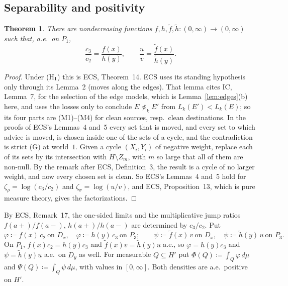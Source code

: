 \documentclass[11pt]{article}
\newtheorem{theorem}{Theorem}
\theoremstyle{definition}\newtheorem{definition}[theorem]{Definition}
\theoremstyle{remark}\newtheorem{remark}[theorem]{Remark}
\newcommand{\ftil}{\tilde f}
\newcommand{\htil}{\tilde h}
\begin{document}
\subsection{Separability and positivity}

\begin{theorem}\label{thm:sep}
There are nondecreasing functions
$f,h,\ftil,\htil\colon(0,\infty)\to(0,\infty)$ such that, a.e.\ on $P_1$,
\[
 \frac{c_3}{c_2}=\frac{f(x)}{h(y)},\qquad\frac uv=\frac{\ftil(x)}{\htil(y)}.
\]
\end{theorem}
\begin{proof}
Under (H$_{\rm I}$) this is ECS, Theorem~14. ECS uses its standing
hypothesis only through its Lemma~2 (moves along the edges). That lemma cites
IC, Lemma~7, for the selection of the edge models, which is
Lemma~\ref{lem:edges}(b) here, and uses the losses only to conclude
$E\not\preceq_kE'$ from $L_k(E')<L_k(E)$; so its four parts are (M1)--(M4)
for clean sources, resp.\ clean destinations. In the proofs of ECS's
Lemmas~4 and~5 every set that is moved, and every set to which advice is
moved, is chosen inside one of the sets of a cycle, and the contradiction is
strict (G) at world~$1$. Given a cycle $(X_i,Y_i)$ of negative weight,
replace each of its sets by its intersection with $H\setminus Z_m$, with $m$
so large that all of them are non-null. By the remark after ECS,
Definition~3, the result is a cycle of no larger weight, and now every chosen
set is clean. So ECS's Lemmas~4 and~5 hold for $\zeta_\rho=\log(c_3/c_2)$ and
$\zeta_\sigma=\log(u/v)$, and ECS, Proposition~13, which is pure measure
theory, gives the factorizations.
\end{proof}

By ECS, Remark~17, the one-sided limits and the multiplicative jump ratios
$f(a+)/f(a-)$, $h(a+)/h(a-)$ are determined by $c_3/c_2$. Put
\[
 \varphi\coloneqq f(x)\,c_2\ \text{on }D_x,\quad
 \varphi\coloneqq h(y)\,c_3\ \text{on }P_3;\qquad
 \psi\coloneqq\ftil(x)\,v\ \text{on }D_x,\quad
 \psi\coloneqq\htil(y)\,u\ \text{on }P_3.
\]
On $P_1$, $f(x)c_2=h(y)c_3$ and $\ftil(x)v=\htil(y)u$ a.e., so
$\varphi=h(y)c_3$ and $\psi=\htil(y)u$ a.e.\ on $D_y$ as well. For
measurable $Q\subseteq H'$ put $\Phi(Q)\coloneqq\int_Q\varphi\,d\mu$ and
$\Psi(Q)\coloneqq\int_Q\psi\,d\mu$, with values in $[0,\infty]$. Both
densities are a.e.\ positive on $H'$.
\end{document}
